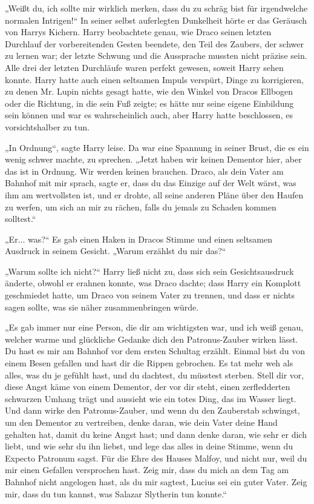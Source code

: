 {„Weißt du, ich sollte mir wirklich merken, dass du zu schräg bist für irgendwelche normalen Intrigen!“ In seiner selbst auferlegten Dunkelheit hörte er das Geräusch von Harrys Kichern. Harry beobachtete genau, wie Draco seinen letzten Durchlauf der vorbereitenden Gesten beendete, den Teil des Zaubers, der schwer zu lernen war; der letzte Schwung und die Aussprache mussten nicht präzise sein. Alle drei der letzten Durchläufe waren perfekt gewesen, soweit Harry sehen konnte. Harry hatte auch einen seltsamen Impuls verspürt, Dinge zu korrigieren, zu denen Mr. Lupin nichts gesagt hatte, wie den Winkel von Dracos Ellbogen oder die Richtung, in die sein Fuß zeigte; es hätte nur seine eigene Einbildung sein können und war es wahrscheinlich auch, aber Harry hatte beschlossen, es vorsichtshalber zu tun.

„In Ordnung“, sagte Harry leise. Da war eine Spannung in seiner Brust, die es ein wenig schwer machte, zu sprechen. „Jetzt haben wir keinen Dementor hier, aber das ist in Ordnung. Wir werden keinen brauchen. Draco, als dein Vater am Bahnhof mit mir sprach, sagte er, dass du das Einzige auf der Welt wärst, was ihm am wertvollsten ist, und er drohte, all seine anderen Pläne über den Haufen zu werfen, um sich an mir zu rächen, falls du jemals zu Schaden kommen solltest.“

„Er... was?“ Es gab einen Haken in Dracos Stimme und einen seltsamen Ausdruck in seinem Gesicht. „Warum erzählst du mir das?“

„Warum sollte ich nicht?“ Harry ließ nicht zu, dass sich sein Gesichtsausdruck änderte, obwohl er erahnen konnte, was Draco dachte; dass Harry ein Komplott geschmiedet hatte, um Draco von seinem Vater zu trennen, und dass er nichts sagen sollte, was sie näher zusammenbringen würde.

„Es gab immer nur eine Person, die dir am wichtigsten war, und ich weiß genau, welcher warme und glückliche Gedanke dich den Patronus-Zauber wirken lässt. Du hast es mir am Bahnhof vor dem ersten Schultag erzählt. Einmal bist du von einem Besen gefallen und hast dir die Rippen gebrochen. Es tat mehr weh als alles, was du je gefühlt hast, und du dachtest, du müsstest sterben. Stell dir vor, diese Angst käme von einem Dementor, der vor dir steht, einen zerfledderten schwarzen Umhang trägt und aussieht wie ein totes Ding, das im Wasser liegt. Und dann wirke den Patronus-Zauber, und wenn du den Zauberstab schwingst, um den Dementor zu vertreiben, denke daran, wie dein Vater deine Hand gehalten hat, damit du keine Angst hast; und dann denke daran, wie sehr er dich liebt, und wie sehr du ihn liebst, und lege das alles in deine Stimme, wenn du Expecto Patronum sagst. Für die Ehre des Hauses Malfoy, und nicht nur, weil du mir einen Gefallen versprochen hast. Zeig mir, dass du mich an dem Tag am Bahnhof nicht angelogen hast, als du mir sagtest, Lucius sei ein guter Vater. Zeig mir, dass du tun kannst, was Salazar Slytherin tun konnte.“

}
